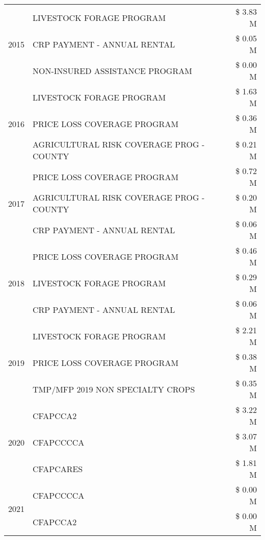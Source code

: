 \begin{tabular}{llr}
\cline{1-3}
\multirow[t]{3}{*}{2015} & LIVESTOCK FORAGE PROGRAM & \$ 3.83 M \\
 & CRP PAYMENT - ANNUAL RENTAL & \$ 0.05 M \\
 & NON-INSURED ASSISTANCE PROGRAM & \$ 0.00 M \\
\cline{1-3}
\multirow[t]{3}{*}{2016} & LIVESTOCK FORAGE PROGRAM & \$ 1.63 M \\
 & PRICE LOSS COVERAGE PROGRAM & \$ 0.36 M \\
 & AGRICULTURAL RISK COVERAGE PROG - COUNTY & \$ 0.21 M \\
\cline{1-3}
\multirow[t]{3}{*}{2017} & PRICE LOSS COVERAGE PROGRAM & \$ 0.72 M \\
 & AGRICULTURAL RISK COVERAGE PROG - COUNTY & \$ 0.20 M \\
 & CRP PAYMENT - ANNUAL RENTAL & \$ 0.06 M \\
\cline{1-3}
\multirow[t]{3}{*}{2018} & PRICE LOSS COVERAGE PROGRAM & \$ 0.46 M \\
 & LIVESTOCK FORAGE PROGRAM & \$ 0.29 M \\
 & CRP PAYMENT - ANNUAL RENTAL & \$ 0.06 M \\
\cline{1-3}
\multirow[t]{3}{*}{2019} & LIVESTOCK FORAGE PROGRAM & \$ 2.21 M \\
 & PRICE LOSS COVERAGE PROGRAM & \$ 0.38 M \\
 & TMP/MFP 2019 NON SPECIALTY CROPS & \$ 0.35 M \\
\cline{1-3}
\multirow[t]{3}{*}{2020} & CFAPCCA2 & \$ 3.22 M \\
 & CFAPCCCCA & \$ 3.07 M \\
 & CFAPCARES & \$ 1.81 M \\
\cline{1-3}
\multirow[t]{2}{*}{2021} & CFAPCCCCA & \$ 0.00 M \\
 & CFAPCCA2 & \$ 0.00 M \\
\cline{1-3}
\bottomrule
\end{tabular}
